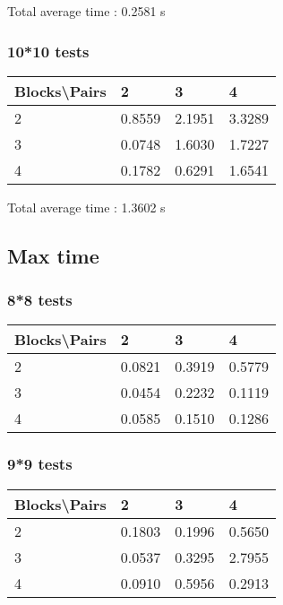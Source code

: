 \documentclass[12pt, a4paper]{article}
\begin{document}
				Total average time : 0.2581 s

			\subsubsection{10*10 tests}

				\begin{tabular}[h]{|l|l|l|l|}
				\hline
				Blocks\textbackslash Pairs & 2 & 3 & 4 \\
				\hline
				2 & 0.8559 & 2.1951 & 3.3289 \\
				\hline
				3 & 0.0748 & 1.6030 & 1.7227 \\
				\hline
				4 & 0.1782 & 0.6291 & 1.6541 \\
				\hline
				\end{tabular}

				Total average time : 1.3602 s

		\subsection{Max time}

			\subsubsection{8*8 tests}

				\begin{tabular}[h]{|l|l|l|l|}
				\hline
				Blocks\textbackslash Pairs & 2 & 3 & 4 \\
				\hline
				2 & 0.0821 & 0.3919 & 0.5779 \\
				\hline
				3 & 0.0454 & 0.2232 & 0.1119 \\
				\hline
				4 & 0.0585 & 0.1510 & 0.1286 \\
				\hline
				\end{tabular}

			\subsubsection{9*9 tests}

				\begin{tabular}[h]{|l|l|l|l|}
				\hline
				Blocks\textbackslash Pairs & 2 & 3 & 4 \\
				\hline
				2 & 0.1803 & 0.1996 & 0.5650 \\
				\hline
				3 & 0.0537 & 0.3295 & 2.7955 \\
				\hline
				4 & 0.0910 & 0.5956 & 0.2913 \\
				\hline
				\end{tabular}
\end{document}
